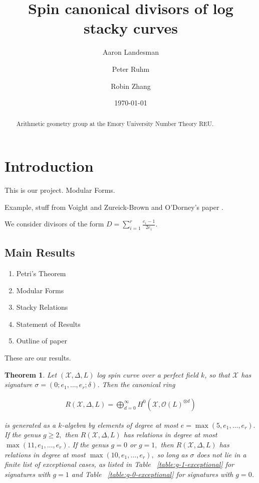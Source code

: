 \documentclass{amsart}
\title{Spin canonical divisors of log stacky curves}
\author{Aaron Landesman}
\author{Peter Ruhm}
\author{Robin Zhang}
\date{\today}
\theoremstyle{plain}
\newtheorem{thm}{Theorem}[section]
\theoremstyle{definition}
\theoremstyle{remark}
\numberwithin{equation}{section}
\newcommand \sx{\mathscr X}
\newcommand\sco{{\mathscr O}}
\newcommand \subhalf[1]{\frac{{#1} - 1}{2{#1}}}
\newcommand \halfcan{L}
\begin{document}
\begin{abstract}
  Arithmetic geometry group at the Emory University Number Theory
	REU.
\end{abstract}

\maketitle

\tableofcontents



\section{Introduction}
This is our project.
Modular Forms.


Example, stuff from Voight and Zureick-Brown \cite{vzb:stacky}
and O'Dorney's paper \cite{dorney:canonical}.

We consider divisors of the form $D = \sum_{i = 1}^{r} \subhalf{e_i}$.

\subsection{Main Results}
\begin{enumerate}
	\item Petri's Theorem
	\item Modular Forms
	\item Stacky Relations
	\item Statement of Results
	\item Outline of paper
\end{enumerate}

These are our results.
\begin{thm}
\label{thm:g_0_generators_relations}
Let $(\sx, \Delta, \halfcan)$ log spin curve over a perfect field $k$, so
that $\sx$ has signature $\sigma = (0; e_1, \ldots, e_r; \delta)$. Then the
canonical ring

\begin{align*}
	R(\sx, \Delta, \halfcan) = \bigoplus_{d = 0}^\infty H^0(\sx, \sco(L)^{\otimes d})
\end{align*}

\noindent
is generated as a $k$-algebra by elements of degree at most $e = 
\max(5,e_1,\ldots, e_r).$ If the genus $g \geq 2,$ then $R(\sx, \Delta, \halfcan)$ has relations in degree at most $\max(11,e_1,\ldots, e_r).$ If the genus $g = 0$ or $g = 1,$ then $R(\sx, \Delta, \halfcan)$ has relations in degree at most $\max(10,e_1,\ldots, e_r),$ so
long as $\sigma$ does not lie in a finite list of exceptional cases, as listed in Table ~\ref{table:g-1-exceptional} for signatures with $g = 1$ and Table ~\ref{table:g-0-exceptional} for signatures with $g = 0$.
\end{thm}
\end{document}
